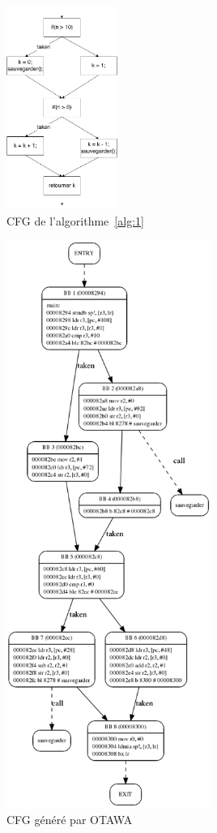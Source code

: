 \documentclass[french]{article}
\begin{document}
  \begin{figure}
    \centering
    \includegraphics[height=250px]{pictures/cfg.png}
    \caption{CFG de l'algorithme~\ref{alg:1}}
    \label{cfg}
  \end{figure}
  
  \begin{figure}
    \centering
    \includegraphics[height=525pt]{pictures/cfg_genere.png}
    \caption{CFG généré par OTAWA}
    \label{cfg_genere}
  \end{figure}
\end{document}
